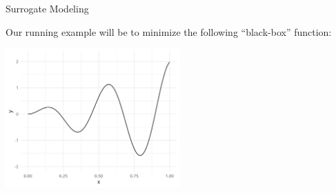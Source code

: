 \documentclass[11pt,compress,t,notes=noshow, xcolor=table]{beamer}
\begin{document}
\begin{frame}{Surrogate Modeling}

Our running example will be to minimize the following \enquote{black-box} function:

\begin{center}
  \includegraphics[width = 0.5\textwidth]{figure_man/loop_0.png}
\end{center}

\end{frame}
\end{document}
